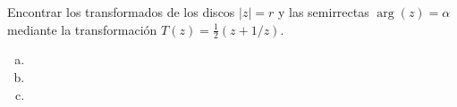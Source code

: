 \documentclass[twoside]{article}
\begin{document}
\begin{ejercicio}{9}
\end{ejercicio}
\begin{solucion}
\end{solucion}
\newpage

\begin{ejercicio}{10}
Encontrar los transformados de los discos $|z|=r$ y las semirrectas $\arg(z)=\alpha$ mediante la transformación $T(z)=\frac{1}{2}(z+1/z)$.
\end{ejercicio}
\begin{solucion}
\begin{enumerate}[(a)]
\item[]
\item 
\item 
\end{enumerate}
\end{solucion}
\newpage

\begin{ejercicio}{11}
\end{ejercicio}
\begin{solucion}
\end{solucion}
\newpage
\end{document}
